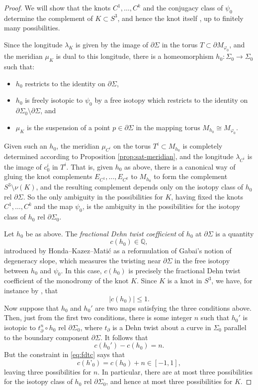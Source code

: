\documentclass[11pt]{amsart}
\numberwithin{equation}{section}
\numberwithin{theorem}{section}
\theoremstyle{definition}
\newcommand{\Q}{\mathbb{Q}}
\begin{document}
\begin{proof}
We will show that the knots $C^1,\dots,C^k$ and the conjugacy class of $\psi_0$ determine the complement of $K\subset S^3$, and hence the knot itself \cite{gordon-luecke-complement}, up to finitely many possibilities. 

Since the longitude $\lambda_K$ is given by the image of $\partial \Sigma$ in the torus $T\subset \partial M_{\varphi_0}$, and the meridian $\mu_K$ is dual to this longitude, there is a homeomorphism $h_0:\Sigma_0\to\Sigma_0$ such that:
\begin{itemize}
\item $h_0$ restricts to the identity on $\partial \Sigma$,
\item $h_0$ is freely isotopic to $\psi_0$ by a free isotopy which restricts to the identity on $\partial \Sigma_0\setminus \partial \Sigma$, and
\item $\mu_K$ is the suspension of a point $p\in \partial \Sigma$ in the mapping torus $M_{h_0}\cong M_{\varphi_0}$.
\end{itemize}
Given such an $h_0$, the meridian $\mu_{C^i}$ on the torus $T^i\subset M_{h_0}$ is completely determined according to Proposition \ref{prop:sat-meridian}, and the longitude $\lambda_{C^i}$ is the image of $c^i_0$ in $T^i$. That is, given $h_0$ as above, there is a canonical way of gluing the knot complements $E_{C^1},\dots, E_{C^k}$ to $M_{h_0}$ to form the complement $S^3\setminus \nu(K)$, and the resulting complement depends only on the isotopy class of $h_0$ rel $\partial \Sigma$. So the only ambiguity in the possibilities for $K$, having fixed the knots $C^1,\dots,C^k$ and the map $\psi_0$, is the ambiguity in the possibilities for the isotopy class of $h_0$ rel $\partial \Sigma_0$.

Let $h_0$ be as above. The \emph{fractional Dehn twist coefficient} of $h_0$ at $\partial \Sigma$ is a quantity \[c(h_0)\in \Q,\] introduced by Honda--Kazez--Mati{\'c} \cite{hkm-veering} as a reformulation of Gabai's notion of degeneracy slope, which measures the twisting near $\partial \Sigma$ in the free isotopy between $h_0$ and $\psi_0$. In this case, $c(h_0)$ is precisely the fractional Dehn twist coefficient of the monodromy of the knot $K$. Since $K$ is a knot in $S^3$, we have, for instance by \cite[Theorem 1]{hedden-mark-fdtc}, that \begin{equation}\label{eq:fdtc}|c(h_0)|\leq 1.\end{equation} Now suppose that $h_0$ and $h_0'$ are two maps satisfying the three conditions above. Then, just from the first two conditions, there is some integer $n$ such that $h_0'$ is isotopic to $t_\partial^n \circ h_0$ rel $\partial \Sigma_0$, where $t_\partial$ is a Dehn twist about a curve in $\Sigma_0$ parallel to the boundary component $\partial \Sigma$. It follows that \[c(h_0')-c(h_0) = n.\] But the constraint in \eqref{eq:fdtc}  says that \[c(h’_0) = c(h_0) + n \in [-1,1],\] leaving three possibilities for $n$.  In particular, there are at most three possibilities for the isotopy class of $h_0$ rel $\partial \Sigma_0$, and hence at most three possibilities for $K$. 


\end{proof}
\end{document}
